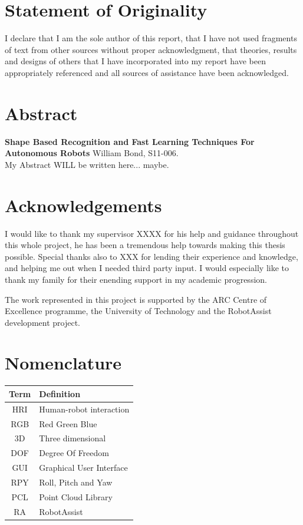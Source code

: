 \documentclass[12pt]{utscapstone}
\begin{document}



\chapter*{Statement of Originality}
I declare that I am the sole author of this report, that I have not used fragments of text from other sources without proper acknowledgment, that theories, results and designs of others that I have incorporated into my report have been appropriately referenced and all sources of assistance have been acknowledged.

\chapter*{Abstract}
{  \bfseries Shape Based Recognition and Fast Learning Techniques For Autonomous Robots }
William Bond, S11-006.\\


My Abstract WILL be written here... maybe.

\chapter*{Acknowledgements}

I would like to thank my supervisor XXXX for his help and guidance throughout this whole project, he has been a tremendous help towards making this thesis possible. Special thanks also to XXX for lending their experience and knowledge, and helping me out when I needed third party input.
I would especially like to thank my family for their enending support in my academic progression.

The work represented in this project is supported by the ARC Centre of Excellence programme, the University of Technology and the RobotAssist development project.


\tableofcontents

\listoffigures

\chapter*{Nomenclature}

\begin{center}
  \begin{tabular}{| c | l |}\hline
    \textbf{Term} & \textbf{Definition}\\ \hline
    HRI & Human-robot interaction\\
    RGB & Red Green Blue\\
    3D & Three dimensional\\
    DOF & Degree Of Freedom\\
    GUI & Graphical User Interface\\
    RPY & Roll, Pitch and Yaw\\
    PCL & Point Cloud Library\\
    RA & RobotAssist\\
    \hline
  \end{tabular}
\end{center}
\end{document}
